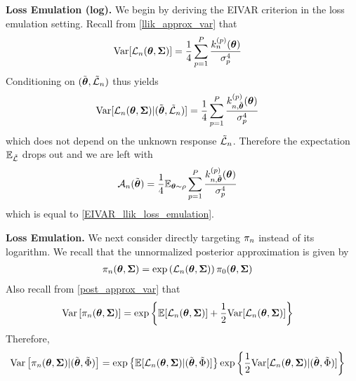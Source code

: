 \documentclass[12pt]{article}
\begin{document}
\bigskip
\noindent
\textbf{Loss Emulation (log).} 
We begin by deriving the EIVAR criterion in the loss emulation setting. Recall from \ref{llik_approx_var} that 
\begin{align*}
\mathrm{Var}[\mathcal{L}_{n}(\boldsymbol{\theta}, \boldsymbol{\Sigma})] &= \frac{1}{4} \sum_{p = 1}^{P} \frac{k_{n}^{(p)}(\boldsymbol{\theta})}{\sigma_{p}^4}
\end{align*}
Conditioning on $(\tilde{\boldsymbol{\theta}}, \tilde{\mathcal{L}}_{n})$ thus yields 
\begin{align*}
\mathrm{Var}[\mathcal{L}_{n}(\boldsymbol{\theta}, \boldsymbol{\Sigma}) | (\tilde{\boldsymbol{\theta}}, \tilde{\mathcal{L}}_{n})] &= \frac{1}{4} \sum_{p = 1}^{P} \frac{k_{n, \tilde{\boldsymbol{\theta}}}^{(p)}(\boldsymbol{\theta})}{\sigma_{p}^4}
\end{align*}
which does not depend on the unknown response $\tilde{\mathcal{L}}_{n}$. Therefore the expectation $\mathbb{E}_{\tilde{\mathcal{L}}}$ drops out and we are left with 
\begin{align*}
\mathcal{A}_{n}(\tilde{\boldsymbol{\theta}}) &= \frac{1}{4} \mathbb{E}_{\boldsymbol{\theta} \sim \rho} \sum_{p = 1}^{P} \frac{k_{n, \tilde{\boldsymbol{\theta}}}^{(p)}(\boldsymbol{\theta})}{\sigma_{p}^4}
\end{align*}
which is equal to \ref{EIVAR_llik_loss_emulation}.

\bigskip
\noindent
\textbf{Loss Emulation.}
 We next consider directly targeting $\pi_{n}$ instead of its logarithm. We recall that the unnormalized posterior approximation is given 
 by 
 \begin{align*}
 \pi_{n}(\boldsymbol{\theta}, \boldsymbol{\Sigma}) &= \exp\left(\mathcal{L}_{n}(\boldsymbol{\theta}, \boldsymbol{\Sigma}) \right)\pi_0(\boldsymbol{\theta}, \boldsymbol{\Sigma})
 \end{align*}
 Also recall from \ref{post_approx_var} that 
 \begin{align*}
 \mathrm{Var}\left[\pi_{n}(\boldsymbol{\theta}, \boldsymbol{\Sigma})\right] &= \exp\left\{\mathbb{E}[\mathcal{L}_{n}(\boldsymbol{\theta}, \boldsymbol{\Sigma})] + \frac{1}{2}\mathrm{Var}[\mathcal{L}_{n}(\boldsymbol{\theta}, \boldsymbol{\Sigma})] \right\}
\end{align*}
Therefore, 
 \begin{align*}
 \mathrm{Var}\left[\pi_{n}(\boldsymbol{\theta}, \boldsymbol{\Sigma}) | (\tilde{\boldsymbol{\theta}}, \tilde{\Phi})\right] &= \exp\left\{\mathbb{E}[\mathcal{L}_{n}(\boldsymbol{\theta}, \boldsymbol{\Sigma}) | (\tilde{\boldsymbol{\theta}}, \tilde{\Phi})]\right\} \exp\left\{\frac{1}{2}\mathrm{Var}[\mathcal{L}_{n}(\boldsymbol{\theta}, \boldsymbol{\Sigma}) | (\tilde{\boldsymbol{\theta}}, \tilde{\Phi})] \right\}
\end{align*}
\end{document}
